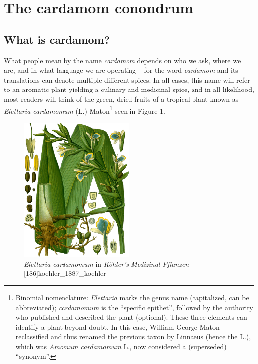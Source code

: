 \documentclass[12pt]{article}
\begin{document}
\section{The cardamom conondrum}\label{sec:plants}

\subsection{What is cardamom?}

What people mean by the name \textit{cardamom} depends on who we ask, where we are, and in what language we are operating -- for the word \textit{cardamom} and its translations can denote multiple different spices. In all cases, this name will refer to an aromatic plant yielding a culinary and medicinal spice, and in all likelihood, most readers will think of the green, dried fruits of a tropical plant known as \textit{Elettaria cardamomum} (L.) Maton\footnote{Binomial nomenclature: \textit{Elettaria} marks the genus name (capitalized, can be abbreviated); \textit{cardamomum} is the ``specific epithet'', followed by the authority who published and described the plant (optional). These three elements can identify a plant beyond doubt. In this case, William George Maton reclassified and thus renamed the previous taxon by Linnaeus (hence the L.), which was \textit{Amomum cardamomum} L., now considered a (superseded) ``synonym''.} seen in Figure \ref{fig:cardamom}.


\begin{figure}
    \centering
    \includegraphics[width=0.5\textwidth]{imgs/cardamom.png}
    \caption{\textit{Elettaria cardamomum} in \textit{Köhler's Medizinal Pflanzen} [186]{koehler_1887_koehler}}
    \label{fig:cardamom}
\end{figure}
\end{document}

